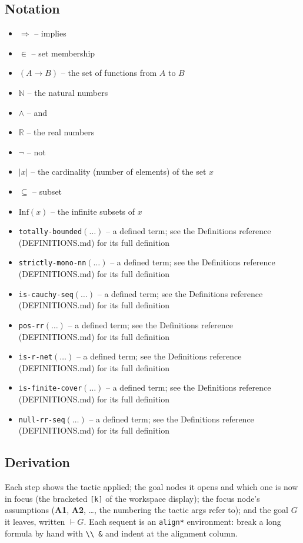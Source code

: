 \documentclass[11pt]{article}
\begin{document}
\subsection*{Notation}
\begin{itemize}
\item $\Rightarrow$ -- implies
\item $\in$ -- set membership
\item $(A \to B)$ -- the set of functions from $A$ to $B$
\item $\mathbb{N}$ -- the natural numbers
\item $\wedge$ -- and
\item $\mathbb{R}$ -- the real numbers
\item $\neg$ -- not
\item $|x|$ -- the cardinality (number of elements) of the set $x$
\item $\subseteq$ -- subset
\item $\mathrm{Inf}(x)$ -- the infinite subsets of $x$
\item \texttt{totally-bounded}$(\ldots)$ -- a defined term; see the Definitions reference (DEFINITIONS.md) for its full definition
\item \texttt{strictly-mono-nn}$(\ldots)$ -- a defined term; see the Definitions reference (DEFINITIONS.md) for its full definition
\item \texttt{is-cauchy-seq}$(\ldots)$ -- a defined term; see the Definitions reference (DEFINITIONS.md) for its full definition
\item \texttt{pos-rr}$(\ldots)$ -- a defined term; see the Definitions reference (DEFINITIONS.md) for its full definition
\item \texttt{is-r-net}$(\ldots)$ -- a defined term; see the Definitions reference (DEFINITIONS.md) for its full definition
\item \texttt{is-finite-cover}$(\ldots)$ -- a defined term; see the Definitions reference (DEFINITIONS.md) for its full definition
\item \texttt{null-rr-seq}$(\ldots)$ -- a defined term; see the Definitions reference (DEFINITIONS.md) for its full definition
\end{itemize}

\subsection*{Derivation}
Each step shows the tactic applied; the goal nodes it opens and which one is now in focus (the bracketed \texttt{[k]} of the workspace display); the focus node's assumptions (\textbf{A1}, \textbf{A2}, \dots{}, the numbering the tactic args refer to); and the goal $G$ it leaves, written $\vdash G$.  Each sequent is an \texttt{align*} environment: break a long formula by hand with \texttt{\textbackslash\textbackslash\ \&} and indent at the alignment column.
\end{document}
